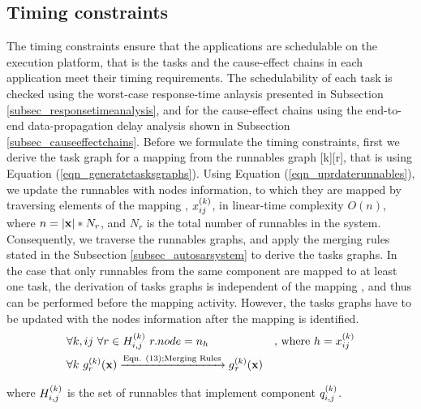 \subsection{Timing constraints}
The timing constraints ensure that the applications are schedulable on the execution platform, that is the tasks and the cause-effect chains in each application meet their timing requirements. The schedulability of each task is checked using the worst-case response-time anlaysis presented in Subsection \ref{subsec_responsetimeanalysis}, and for the cause-effect chains using the end-to-end data-propagation delay analysis shown in Subsection \ref{subsec_causeeffectchains}. Before we formulate the timing constraints, first we derive the task graph for a mapping \ttx from the runnables graph [k][r], that is using Equation (\ref{eqn_generatetasksgraphs}).  Using Equation (\ref{eqn_uprdaterunnables}), we update the runnables with nodes information, to which they are mapped by traversing elements of the mapping \ttx, $x^{(k)}_{ij}$, in linear-time complexity $O(n)$, where $n=|\textbf{x}|*N_r$, and $N_r$ is the total number of runnables in the system. Consequently, we traverse the runnables graphs, and apply the merging rules stated in the Subsection \ref{subsec_autosarsystem} to derive the tasks graphs. In the case that only runnables from the same component are mapped to at least one task, the derivation of tasks graphs is independent of the mapping \ttx, and thus can be performed before the mapping activity. However, the tasks graphs have to be updated with the nodes information after the mapping \ttx is identified.
\begin{align}
\label{eqn_uprdaterunnables}
&\forall k,ij\ \forall r\in \sss{H}[k][i,j]\ r.node = n_h& \mbox{, where } h=\xkij\\
\label{eqn_generatetasksgraphs}
&\forall k\ \sss{g}[k][r](\x)\xrightarrow{\text{Eqn. (13);Merging Rules}}\sss{g}[k][\tau](\x)
\end{align}

where $\sss{H}[k][i,j]$ is the set of runnables that implement component $\sss{q}[k][i,j]$.


